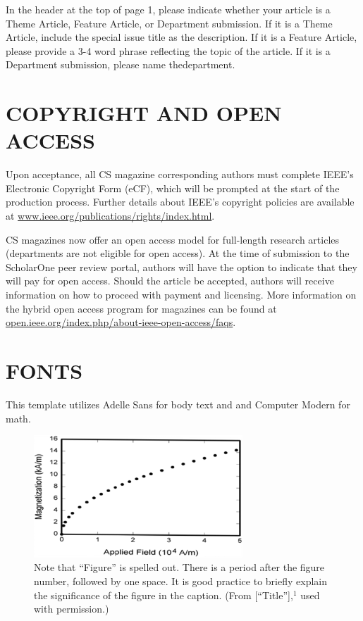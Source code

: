 \documentclass{IEEEcsmag}
\begin{document}
In the header at the top of page 1, please indicate whether your article is a Theme Article, Feature Article, or Department submission. If it is a Theme Article, include the special issue title as the description. If it is a Feature Article, please provide a 3-4 word phrase reflecting the topic of the article. If it is a Department submission, please name the\break department.\vadjust{\pagebreak} 

\section{COPYRIGHT AND OPEN ACCESS}

Upon acceptance, all CS magazine corresponding authors must complete IEEE's Electronic Copyright Form (eCF), which will be prompted at the start of the production process. Further details about IEEE's copyright policies are available at \href{https://www.ieee.org/publications/rights/index.html}{www.ieee.org/publications/rights/index.html}. 

CS magazines now offer an open access model for full-length research articles (departments are not eligible for open access). At the time of submission to the ScholarOne peer review portal, authors will have the option to indicate that they will pay for open access. Should the article be accepted, authors will receive information on how to proceed with payment and licensing. More information on the hybrid open access program for magazines can be found at \href{https://open.ieee.org/index.php/about-ieee-open-access/faqs}{open.ieee.org/index.php/about-ieee-open-access/faqs}.\vspace*{-10pt}


\section{FONTS}

This template utilizes Adelle Sans for body text and and Computer Modern for math.\vspace*{-5pt}

\begin{figure}
\centerline{\includegraphics[width=18.5pc]{fig1.jpg}}
\caption{Note that ``Figure'' is spelled out. There is a period after the figure number, followed by one space. It is good practice to briefly explain the significance of the figure in the caption. (From [``Title''],$^1$ used with permission.)}\vspace*{-5pt}
\end{figure}
\end{document}
